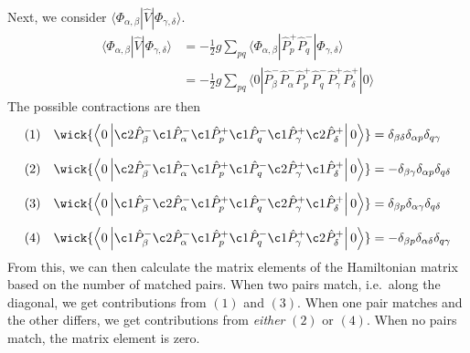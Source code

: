 Next, we consider $\langle \Phi_{\alpha, \beta} | \hat{V} | \Phi_{\gamma, \delta} \rangle$.
\begin{align*}
    \langle \Phi_{\alpha, \beta} | \hat{V} | \Phi_{\gamma, \delta} \rangle
    &= -\frac{1}{2} g \sum_{pq} \langle \Phi_{\alpha, \beta} | \hat{P}_p^+ \hat{P}_q^- | \Phi_{\gamma, \delta} \rangle \\
    &= -\frac{1}{2} g \sum_{pq} \langle 0 | \hat{P}_\beta^- \hat{P}_\alpha^- \hat{P}_p^+ \hat{P}_q^- \hat{P}_\gamma^+ \hat{P}_\delta^+| 0 \rangle
\end{align*}
The possible contractions are then
\begin{align*}
    (1) \quad \wick{
        \left\langle 0 \left\vert
        \c2 {\hat{P}_\beta^-}
        \c1 {\hat{P}_\alpha^-}
        \c1 {\hat{P}_p^+}
        \c1 {\hat{P}_q^-}
        \c1 {\hat{P}_\gamma^+}
        \c2 {\hat{P}_\delta^+}
        \right\vert 0 \right\rangle
    } &= \delta_{\beta \delta} \delta_{\alpha p} \delta_{q \gamma} \\[0.5em]
    (2) \quad \wick{
        \left\langle 0 \left\vert
        \c2 {\hat{P}_\beta^-}
        \c1 {\hat{P}_\alpha^-}
        \c1 {\hat{P}_p^+}
        \c1 {\hat{P}_q^-}
        \c2 {\hat{P}_\gamma^+}
        \c1 {\hat{P}_\delta^+}
        \right\vert 0 \right\rangle
    } &= -\delta_{\beta \gamma} \delta_{\alpha p} \delta_{q \delta} \\[0.5em]
    (3) \quad \wick{
        \left\langle 0 \left\vert
        \c1 {\hat{P}_\beta^-}
        \c2 {\hat{P}_\alpha^-}
        \c1 {\hat{P}_p^+}
        \c1 {\hat{P}_q^-}
        \c2 {\hat{P}_\gamma^+}
        \c1 {\hat{P}_\delta^+}
        \right\vert 0 \right\rangle
    } &= \delta_{\beta p} \delta_{\alpha \gamma} \delta_{q \delta} \\[0.5em]
    (4) \quad \wick{
        \left\langle 0 \left\vert
        \c1 {\hat{P}_\beta^-}
        \c2 {\hat{P}_\alpha^-}
        \c1 {\hat{P}_p^+}
        \c1 {\hat{P}_q^-}
        \c1 {\hat{P}_\gamma^+}
        \c2 {\hat{P}_\delta^+}
        \right\vert 0 \right\rangle
    } &= -\delta_{\beta p} \delta_{\alpha \delta} \delta_{q \gamma}
\end{align*}
From this, we can then calculate the matrix elements of the Hamiltonian matrix based on the number of matched pairs.
When two pairs match, i.e.~along the diagonal, we get contributions from $(1)$ and $(3)$.
When one pair matches and the other differs, we get contributions from \textit{either} $(2)$ or $(4)$.
When no pairs match, the matrix element is zero.

